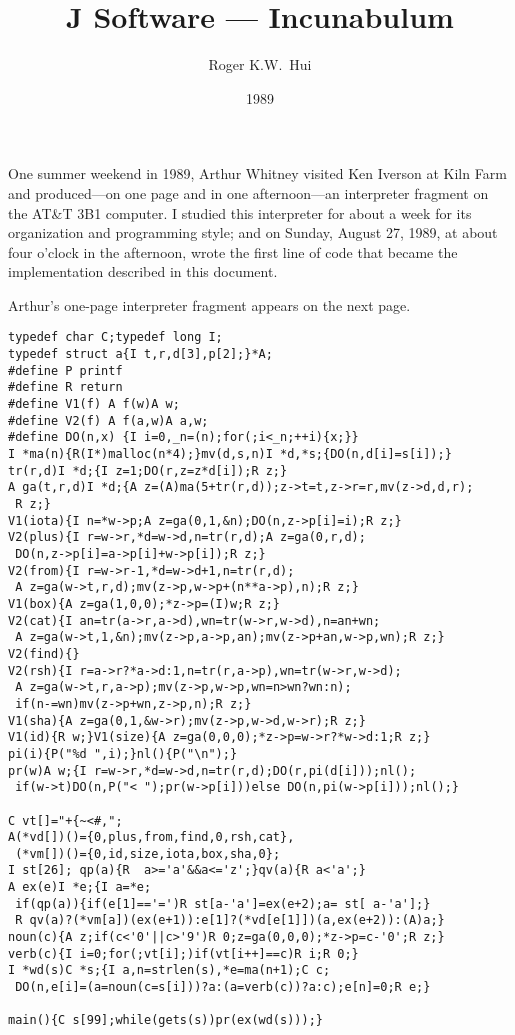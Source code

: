 \documentclass[12pt,letterpaper]{article}
\title{J Software --- Incunabulum}
\author{Roger K.W.~Hui}
\date{1989}
\begin{document}
\frenchspacing
\maketitle

\noindent One summer weekend in 1989, Arthur Whitney visited Ken Iverson at Kiln Farm
and produced---on one page and in one afternoon---an interpreter fragment on
the AT\&T 3B1 computer. I studied this interpreter for about a week for its
organization and programming style; and on Sunday, August 27, 1989, at about
four o'clock in the afternoon, wrote the first line of code that became the
implementation described in this document.

Arthur's one-page interpreter fragment appears on the next page.
\vfil\eject
\small
\begin{verbatim}
typedef char C;typedef long I;
typedef struct a{I t,r,d[3],p[2];}*A;
#define P printf
#define R return
#define V1(f) A f(w)A w;
#define V2(f) A f(a,w)A a,w;
#define DO(n,x) {I i=0,_n=(n);for(;i<_n;++i){x;}}
I *ma(n){R(I*)malloc(n*4);}mv(d,s,n)I *d,*s;{DO(n,d[i]=s[i]);}
tr(r,d)I *d;{I z=1;DO(r,z=z*d[i]);R z;}
A ga(t,r,d)I *d;{A z=(A)ma(5+tr(r,d));z->t=t,z->r=r,mv(z->d,d,r);
 R z;}
V1(iota){I n=*w->p;A z=ga(0,1,&n);DO(n,z->p[i]=i);R z;}
V2(plus){I r=w->r,*d=w->d,n=tr(r,d);A z=ga(0,r,d);
 DO(n,z->p[i]=a->p[i]+w->p[i]);R z;}
V2(from){I r=w->r-1,*d=w->d+1,n=tr(r,d);
 A z=ga(w->t,r,d);mv(z->p,w->p+(n**a->p),n);R z;}
V1(box){A z=ga(1,0,0);*z->p=(I)w;R z;}
V2(cat){I an=tr(a->r,a->d),wn=tr(w->r,w->d),n=an+wn;
 A z=ga(w->t,1,&n);mv(z->p,a->p,an);mv(z->p+an,w->p,wn);R z;}
V2(find){}
V2(rsh){I r=a->r?*a->d:1,n=tr(r,a->p),wn=tr(w->r,w->d);
 A z=ga(w->t,r,a->p);mv(z->p,w->p,wn=n>wn?wn:n);
 if(n-=wn)mv(z->p+wn,z->p,n);R z;}
V1(sha){A z=ga(0,1,&w->r);mv(z->p,w->d,w->r);R z;}
V1(id){R w;}V1(size){A z=ga(0,0,0);*z->p=w->r?*w->d:1;R z;}
pi(i){P("%d ",i);}nl(){P("\n");}
pr(w)A w;{I r=w->r,*d=w->d,n=tr(r,d);DO(r,pi(d[i]));nl();
 if(w->t)DO(n,P("< ");pr(w->p[i]))else DO(n,pi(w->p[i]));nl();}

C vt[]="+{~<#,";
A(*vd[])()={0,plus,from,find,0,rsh,cat},
 (*vm[])()={0,id,size,iota,box,sha,0};
I st[26]; qp(a){R  a>='a'&&a<='z';}qv(a){R a<'a';}
A ex(e)I *e;{I a=*e;
 if(qp(a)){if(e[1]=='=')R st[a-'a']=ex(e+2);a= st[ a-'a'];}
 R qv(a)?(*vm[a])(ex(e+1)):e[1]?(*vd[e[1]])(a,ex(e+2)):(A)a;}
noun(c){A z;if(c<'0'||c>'9')R 0;z=ga(0,0,0);*z->p=c-'0';R z;}
verb(c){I i=0;for(;vt[i];)if(vt[i++]==c)R i;R 0;}
I *wd(s)C *s;{I a,n=strlen(s),*e=ma(n+1);C c;
 DO(n,e[i]=(a=noun(c=s[i]))?a:(a=verb(c))?a:c);e[n]=0;R e;}

main(){C s[99];while(gets(s))pr(ex(wd(s)));}
\end{verbatim}
\end{document}
